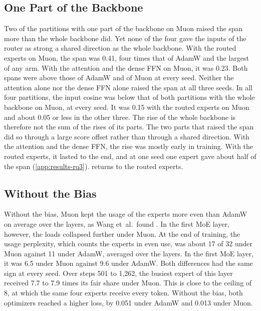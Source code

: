 \subsection{One Part of the Backbone}
\label{sec:results-rq3-parts}
Two of the partitions with one part of the backbone on Muon raised the span more than the whole backbone did. Yet none of the four gave the inputs of the router as strong a shared direction as the whole backbone. With the routed experts on Muon, the span was 0.41, four times that of AdamW and the largest of any arm. With the attention and the dense FFN on Muon, it was 0.23. Both spans were above those of AdamW and of Muon at every seed. Neither the attention alone nor the dense FFN alone raised the span at all three seeds. In all four partitions, the input cosine was below that of both partitions with the whole backbone on Muon, at every seed. It was 0.15 with the routed experts on Muon and about 0.05 or less in the other three. The rise of the whole backbone is therefore not the sum of the rises of its parts. The two parts that raised the span did so through a large score offset rather than through a shared direction. With the attention and the dense FFN, the rise was mostly early in training. With the routed experts, it lasted to the end, and at one seed one expert gave about half of the span (\cref{app:results-rq3}).  returns to the routed experts.

\subsection{Without the Bias}
\label{sec:results-rq3-unbalanced}
Without the bias, Muon kept the usage of the experts more even than AdamW on average over the layers, as Wang et~al.\ found \cite{wang2026depth}. In the first MoE layer, however, the loads collapsed further under Muon. At the end of training, the usage perplexity, which counts the experts in even use, was about 17 of 32 under Muon against 11 under AdamW, averaged over the layers. In the first MoE layer, it was 6.5 under Muon against 9.6 under AdamW\@. Both differences had the same sign at every seed. Over steps 501 to 1,262, the busiest expert of this layer received 7.7 to 7.9 times its fair share under Muon. This is close to the ceiling of 8, at which the same four experts receive every token. Without the bias, both optimizers reached a higher loss, by 0.051 under AdamW and 0.013 under Muon.


